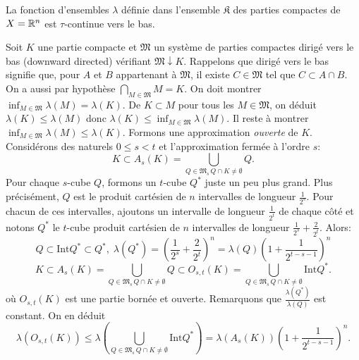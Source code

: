 \begin{propn}\label{Prop:VolCompContVB}
 La fonction d'ensembles $\lambda$ définie dans l'ensemble $\mathfrak{K}$ des parties compactes de $X=\mathbb{R}^n$ est $\tau$-continue vers le bas.
\end{propn}
\begin{demo}
Soit $K$ une partie compacte et $\mathfrak{M}$ un système de parties compactes dirigé vers le bas (downward directed) vérifiant $\mathfrak{M} \downarrow K$.\newline
Rappelons que dirigé vers le bas  signifie que, pour $A$ et $B$ appartenant à $\mathfrak{M}$, il existe $C\in \mathfrak{M}$ tel que $C \subset A \cap B$. On a aussi par hypothèse $\bigcap_{M \in \mathfrak{M}}M = K$.\newline
On doit montrer $\inf_{M \in \mathfrak{M}} \lambda(M) = \lambda(K)$.\newline
De $K \subset M$ pour tous les $M \in \mathfrak{M}$, on déduit $\lambda(K) \leq \lambda(M)$ donc $\lambda(K) \leq \inf_{M \in \mathfrak{M}}\lambda(M)$.\newline
Il reste à montrer $\inf_{M \in \mathfrak{M}}\lambda(M) \leq \lambda(K)$.\newline
Formons une approximation \emph{ouverte} de $K$.\newline
Considérons des naturels $0 \leq s < t$ et l'approximation fermée à l'ordre $s$:
\begin{displaymath}
 K \subset A_s(K) = \bigcup_{Q\in \mathfrak{M}_s \, Q\cap K \neq \emptyset}Q.
\end{displaymath}
Pour chaque $s$-cube $Q$, formons un $t$-cube $Q^*$ juste un peu plus grand. Plus précisément, $Q$ est le produit cartésien de $n$ intervalles de longueur $\frac{1}{2^s}$.  Pour chacun de ces intervalles, ajoutons un intervalle de longueur $\frac{1}{2^t}$ de chaque côté et notons $Q^*$ le $t$-cube produit cartésien de $n$ intervalles de longueur $\frac{1}{2^s}+ \frac{2}{2^t}$. Alors:
\begin{displaymath}
 Q \subset \mathrm{Int}Q^* \subset Q^*, \; \lambda(Q^*) = \left( \frac{1}{2^s}+ \frac{2}{2^t}\right)^n = \lambda(Q)\left( 1 + \frac{1}{2^{t-s-1}}\right)^n
\end{displaymath}
\begin{displaymath}
 K \subset A_s(K) = \bigcup_{Q\in \mathfrak{M}_s \, Q\cap K \neq \emptyset}Q
            \subset O_{s,t}(K) = \bigcup_{Q\in \mathfrak{M}_s \, Q\cap K \neq \emptyset} \mathrm{Int} Q^*.
\end{displaymath}
où $O_{s,t}(K)$ est une partie bornée et ouverte.\newline
Remarquons que $\frac{\lambda(Q^*)}{\lambda(Q)}$ est constant. On en déduit
\begin{displaymath}
 \lambda(O_{s,t}(K)) \leq \lambda\left( \bigcup_{Q\in \mathfrak{M}_s \, Q\cap K \neq \emptyset} \mathrm{Int} Q^*\right)
 = \lambda(A_s(K)) \left( 1 + \frac{1}{2^{t-s-1}}\right)^n.
\end{displaymath}


\end{demo}

